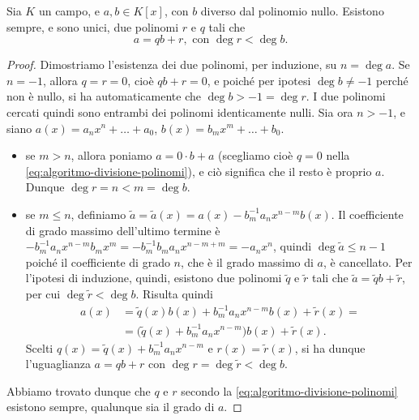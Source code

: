 \begin{teorema}
	Sia $K$ un campo, e $a,b\in K[x]$, con $b$ diverso dal polinomio nullo.
	Esistono sempre, e sono unici, due polinomi $r$ e $q$ tali che
	\begin{equation}
		a=qb+r,\text{ con }\deg r<\deg b.
		\label{eq:algoritmo-divisione-polinomi}
	\end{equation}
\end{teorema}
\begin{proof}
	Dimostriamo l'esistenza dei due polinomi, per induzione, su $n=\deg a$.
	Se $n=-1$, allora $q=r=0$, cioè $qb+r=0$, e poiché per ipotesi $\deg b\ne -1$ perché non è nullo, si ha automaticamente che $\deg b>-1=\deg r$.
	I due polinomi cercati quindi sono entrambi dei polinomi identicamente nulli.
	Sia ora $n>-1$, e siano $a(x)=a_nx^n+\dots+a_0$, $b(x)=b_mx^m+\dots+b_0$.
	\begin{itemize}
		\item se $m>n$, allora poniamo $a=0\cdot b+a$ (scegliamo cioè $q=0$ nella \eqref{eq:algoritmo-divisione-polinomi}), e ciò significa che il resto è proprio $a$.
			Dunque $\deg r=n<m=\deg b$.
		\item se $m\leq n$, definiamo $\tilde{a}=\tilde{a}(x)=a(x)-b_m^{-1}a_nx^{n-m}b(x)$.
			Il coefficiente di grado massimo dell'ultimo termine è $-b_m^{-1}a_nx^{n-m}b_mx^m=-b_m^{-1}b_ma_nx^{n-m+m}=-a_nx^n$, quindi $\deg\tilde{a}\leq n-1$ poiché il coefficiente di grado $n$, che è il grado massimo di $a$, è cancellato.
		Per l'ipotesi di induzione, quindi, esistono due polinomi $\tilde{q}$ e $\tilde{r}$ tali che $\tilde{a}=\tilde{q}b+\tilde{r}$, per cui $\deg\tilde{r}<\deg b$.
		Risulta quindi
		\begin{align*}
			a(x)&=\tilde{q}(x)b(x)+b_m^{-1}a_nx^{n-m}b(x)+\tilde{r}(x)=\\
			&=\big(\tilde{q}(x)+b_m^{-1}a_nx^{n-m}\big)b(x)+\tilde{r}(x).
		\end{align*}
		Scelti $q(x)=\tilde{q}(x)+b_m^{-1}a_nx^{n-m}$ e $r(x)=\tilde{r}(x)$, si ha dunque l'uguaglianza $a=qb+r$ con $\deg r=\deg\tilde{r}<\deg b$.
	\end{itemize}
	Abbiamo trovato dunque che $q$ e $r$ secondo la \eqref{eq:algoritmo-divisione-polinomi} esistono sempre, qualunque sia il grado di $a$.


\end{proof}
